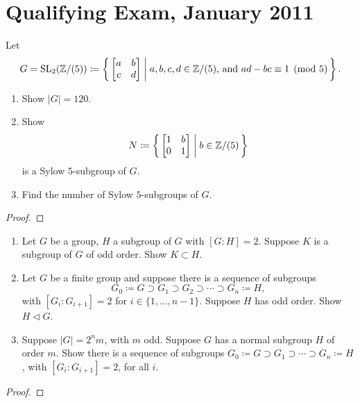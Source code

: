 \chapter{Qualifying Exam, January 2011}
\begin{problem}
Let
\[
G=\operatorname{SL}_2(\mathbb{Z}/(5))\coloneqq
\left\{\,\begin{bmatrix}a&b\\c&d\end{bmatrix}\;\middle|\;
\text{$a,b,c,d\in\mathbb{Z}/(5)$, and $ad-bc\equiv 1\pmod{5}$}\,\right\}.
\]
\begin{enumerate}[label=(\alph*)]
\item Show $|G|=120$.
\item Show
\[
N\coloneqq\left\{\,\begin{bmatrix}1&b\\0&1\end{bmatrix}\;\middle|\;b\in\mathbb{Z}/(5)\,\right\}
\]
is a Sylow $5$-subgroup of $G$.
\item Find the number of Sylow $5$-subgroups of $G$.
\end{enumerate}
\end{problem}
\begin{proof}
\end{proof}

\begin{problem}
\begin{enumerate}[label=(\alph*)]
\item Let $G$ be a group, $H$ a subgroup of $G$ with $[G:H]=2$. Suppose $K$
  is a subgroup of $G$ of odd order. Show $K\subset H$.
\item Let $G$ be a finite group and suppose there is a sequence of
  subgroups
\[
  G_0\coloneqq G\supset G_1\supset G_2\supset\cdots\supset  G_n\coloneqq H,
\]
with $[G_i:G_{i+1}]=2$ for $i\in\{1,...,n-1\}$. Suppose $H$ has odd
order. Show $H\lhd G$.
\item Suppose $|G|=2^nm$, with $m$ odd. Suppose $G$ has a normal subgroup
  $H$ of order $m$. Show there is a sequence of subgroups $G_0\coloneqq
  G\supset G_1\supset\cdots\supset G_n\coloneqq H$, with $[G_i:G_{i+1}]=2$,
  for all $i$.
\end{enumerate}
\end{problem}
\begin{proof}
\end{proof}

